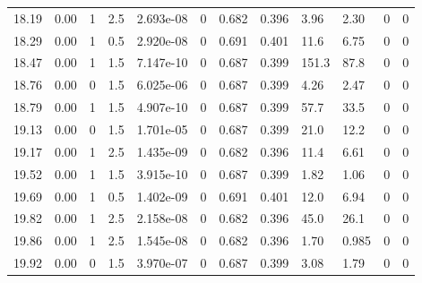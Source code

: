 \documentclass[preview]{standalone}
\begin{document}
{{{\begin{tabular}{L{1.2cm}C{1.2cm} C{0.3cm}C{0.5cm} C{1.4cm}C{1.4cm} C{1.4cm}C{1.4cm} C{1.6cm}C{1.6cm} C{1.6cm}C{1.6cm}}
  18.19  &  0.00  & 1     & 2.5 &  2.693e-08  & 0  &  0.682&   0.396& 3.96 & 2.30   &  0 & 0  \\ 
  18.29  &  0.00  & 1     & 0.5 &  2.920e-08  & 0  &  0.691&   0.401& 11.6 & 6.75   &  0 & 0  \\ 
  18.47  &  0.00  & 1     & 1.5 &  7.147e-10  & 0  &  0.687&   0.399& 151.3 & 87.8   &  0 & 0  \\ 
  18.76  &  0.00  & 0     & 1.5 &  6.025e-06  & 0  &  0.687&   0.399& 4.26 & 2.47   &  0 & 0  \\ 
  18.79  &  0.00  & 1     & 1.5 &  4.907e-10  & 0  &  0.687&   0.399& 57.7 & 33.5   &  0 & 0  \\ 
  19.13  &  0.00  & 0     & 1.5 &  1.701e-05  & 0  &  0.687&   0.399& 21.0 & 12.2   &  0 & 0  \\ 
  19.17  &  0.00  & 1     & 2.5 &  1.435e-09  & 0  &  0.682&   0.396& 11.4 & 6.61   &  0 & 0  \\ 
  19.52  &  0.00  & 1     & 1.5 &  3.915e-10  & 0  &  0.687&   0.399& 1.82 & 1.06   &  0 & 0  \\ 
  19.69  &  0.00  & 1     & 0.5 &  1.402e-09  & 0  &  0.691&   0.401& 12.0 & 6.94   &  0 & 0  \\ 
  19.82  &  0.00  & 1     & 2.5 &  2.158e-08  & 0  &  0.682&   0.396& 45.0 & 26.1   &  0 & 0  \\ 
  19.86  &  0.00  & 1     & 2.5 &  1.545e-08  & 0  &  0.682&   0.396& 1.70 & 0.985   &  0 & 0  \\ 
  19.92  &  0.00  & 0     & 1.5 &  3.970e-07  & 0  &  0.687&   0.399& 3.08 & 1.79   &  0 & 0  \\ 
\hline 
\end{tabular} 

}}}
\end{document}
